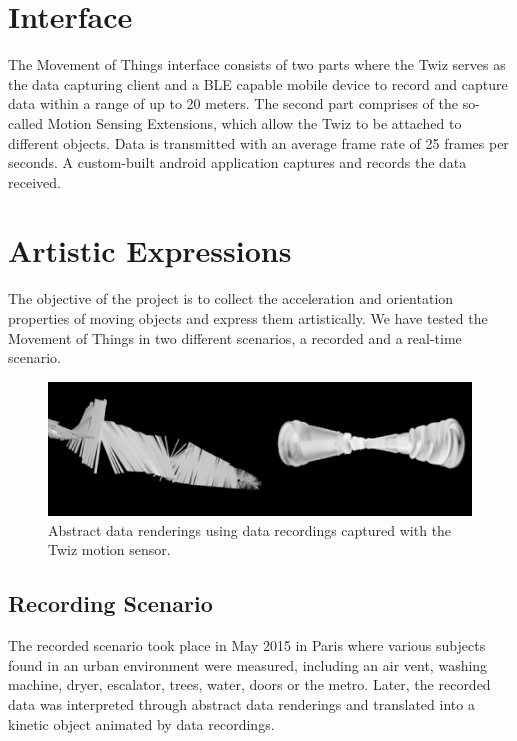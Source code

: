 \documentclass{sigchi}
\begin{document}
\section{Interface}

The Movement of Things interface consists of two parts
where the Twiz serves as the data capturing client and a
BLE capable mobile device to record and capture data
within a range of up to 20 meters. The second part
comprises of the so-called Motion Sensing Extensions,
which allow the Twiz to be attached to different objects.
Data is transmitted with an average frame rate of 25
frames per seconds. A custom-built android application
captures and records the data received.

\section{Artistic Expressions}

The objective of the project is to collect the acceleration
and orientation properties of moving objects and
express them artistically. We have tested the
Movement of Things in two different scenarios, a
recorded and a real-time scenario.

\begin{figure}[H]
\centering
\includegraphics[width=\columnwidth]{pics/renderings}
\caption{Abstract data renderings using data recordings
captured with the Twiz motion sensor.}
\label{fig:renderings}
\end{figure}

\subsection{Recording Scenario}
The recorded scenario took place in May 2015 in Paris
where various subjects found in an urban environment
were measured, including an air vent, washing
machine, dryer, escalator, trees, water, doors or the
metro. Later, the recorded data was interpreted
through abstract data renderings and translated into a
kinetic object animated by data recordings.
\end{document}
